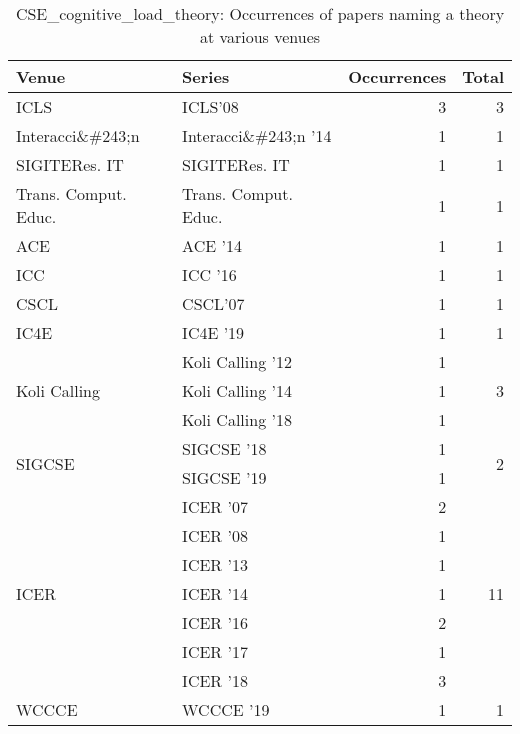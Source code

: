 \begin{table*}[t]
\begin{tabular}{llrr}
Venue & Series & Occurrences & Total\\\hline
\multirow{1}{*}{ICLS} & ICLS'08 & 3 & \multirow{1}{*}{3}\\
\multirow{1}{*}{Interacci\&\#243;n } & Interacci\&\#243;n '14 & 1 & \multirow{1}{*}{1}\\
\multirow{1}{*}{SIGITERes. IT} & SIGITERes. IT & 1 & \multirow{1}{*}{1}\\
\multirow{1}{*}{Trans. Comput. Educ.} & Trans. Comput. Educ. & 1 & \multirow{1}{*}{1}\\
\multirow{1}{*}{ACE } & ACE '14 & 1 & \multirow{1}{*}{1}\\
\multirow{1}{*}{ICC } & ICC '16 & 1 & \multirow{1}{*}{1}\\
\multirow{1}{*}{CSCL} & CSCL'07 & 1 & \multirow{1}{*}{1}\\
\multirow{1}{*}{IC4E } & IC4E '19 & 1 & \multirow{1}{*}{1}\\
\multirow{3}{*}{Koli Calling } & Koli Calling '12 & 1 & \multirow{3}{*}{3}\\
& Koli Calling '14 & 1 &\\
& Koli Calling '18 & 1 &\\
\multirow{2}{*}{SIGCSE } & SIGCSE '18 & 1 & \multirow{2}{*}{2}\\
& SIGCSE '19 & 1 &\\
\multirow{7}{*}{ICER } & ICER '07 & 2 & \multirow{7}{*}{11}\\
& ICER '08 & 1 &\\
& ICER '13 & 1 &\\
& ICER '14 & 1 &\\
& ICER '16 & 2 &\\
& ICER '17 & 1 &\\
& ICER '18 & 3 &\\
\multirow{1}{*}{WCCCE } & WCCCE '19 & 1 & \multirow{1}{*}{1}\\
\end{tabular}
\caption{CSE\_cognitive\_load\_theory: Occurrences of papers naming a theory at various venues}
\end{table*}